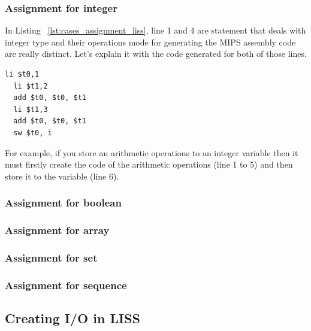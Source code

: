 \documentclass[
  oneside,
  11pt, a4paper,
  footinclude=true,
  headinclude=true,
  cleardoublepage=empty
]{scrbook}
\begin{document}
\subsubsection{Assignment for integer}

In Listing ~\ref{lst:cases_assignment_liss}, line 1 and 4 are statement that deals with integer type and their operations mode for generating the MIPS assembly code are really distinct.
Let's explain it with the code generated for both of those lines.

\begin{lstlisting}[caption={Code generated for line 1 in Listing ~\ref{lst:cases_assignment_liss}},label={lst:storing_integer}]
  li $t0,1		
  li $t1,2		
  add $t0, $t0, $t1	
  li $t1,3		
  add $t0, $t0, $t1	
  sw $t0, i		
\end{lstlisting}

For example, if you store an arithmetic operations to an integer variable then it must firstly create the code of the arithmetic operations (line 1 to 5) and then store it to the variable (line 6).



\subsubsection{Assignment for boolean}

\subsubsection{Assignment for array}

\subsubsection{Assignment for set}

\subsubsection{Assignment for sequence}






\subsection{Creating I/O in LISS}

\end{document}
